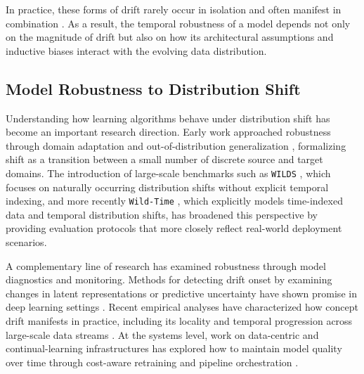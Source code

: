 In practice, these forms of drift rarely occur in isolation and often manifest in combination \cite{aguiar2023comprehensiveanalysisconceptdrift}. As a result, the temporal robustness of a model depends not only on the magnitude of drift but also on how its architectural assumptions and inductive biases interact with the evolving data distribution.

\subsection{Model Robustness to Distribution Shift}


Understanding how learning algorithms behave under distribution shift has become an important research direction. Early work approached robustness through domain adaptation \cite{ben2010theory} and out-of-distribution generalization \cite{gulrajani2021in_search_of_lost}, formalizing shift as a transition between a small number of discrete source and target domains. The introduction of large-scale benchmarks such as \texttt{WILDS} \cite{koh2021wilds}, which focuses on naturally occurring distribution shifts without explicit temporal indexing, and more recently \texttt{Wild-Time} \cite{yao2022wildtime}, which explicitly models time-indexed data and temporal distribution shifts, has broadened this perspective by providing evaluation protocols that more closely reflect real-world deployment scenarios.

A complementary line of research has examined robustness through model diagnostics and monitoring. Methods for detecting drift onset by examining changes in latent representations or predictive uncertainty have shown promise in deep learning settings \iflncs\cite{rabanser_failing_2019}\else\cite{rabanser_failing_2019,ackerman2021automaticallydetectingdatadrift}\fi. Recent empirical analyses have characterized how concept drift manifests in practice, including its locality and temporal progression across large-scale data streams \cite{aguiar2023comprehensiveanalysisconceptdrift}. At the systems level, work on data-centric and continual-learning infrastructures has explored how to maintain model quality over time through cost-aware retraining and pipeline orchestration \iflncs\cite{mahadevan_cost_aware_2024,boether_modyn_2025}\else\cite{mahadevan_cost_effective_2023,mahadevan_cost_aware_2024,tian_continuum_2018,boether_modyn_2025,holzinger2024analysis}\fi.

